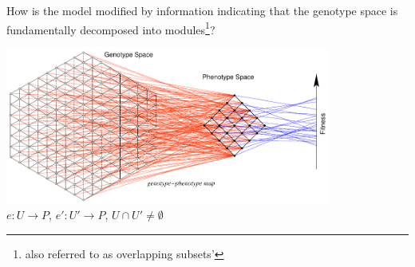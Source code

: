 \begin{frame}
How is the model modified by information indicating that the genotype space is fundamentally decomposed into modules\footnote{also referred to as overlapping subsets'}?
\begin{center}
\includegraphics[width=0.8\textwidth]{fig/gpmap.pdf}\\
$e \colon U \longrightarrow P$, $e' \colon U' \longrightarrow P$, $U \cap U' \neq \emptyset$
\end{center}
\end{frame}
